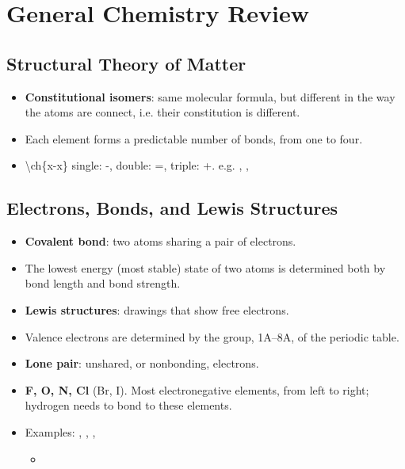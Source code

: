 \documentclass[12pt,a4paper]{article}
\begin{document}
\tableofcontents
\cleardoublepage
\fancyhead{}

\clearpage
{}
\clearpage
\section{General Chemistry Review}
\subsection{Structural Theory of Matter}
\begin{itemize}
    \item \textbf{Constitutional isomers}: same molecular formula, but different in the way the atoms are connect, i.e. their constitution is different.
    \item Each element forms a predictable number of bonds, from one to four.
    \item \textbackslash ch\{x-x\} single: -, double: =, triple: +. e.g. , , 
\end{itemize}

\subsection{Electrons, Bonds, and Lewis Structures}
\begin{itemize}
    \item \textbf{Covalent bond}: two atoms sharing a pair of electrons.
    \item The lowest energy (most stable) state of two atoms is determined both by bond length and bond strength.
    \item \textbf{Lewis structures}: drawings that show free electrons.
    \item Valence electrons are determined by the group, 1A--8A, of the periodic table.
    \item \textbf{Lone pair}: unshared, or nonbonding, electrons.
    \item \textbf{F, O, N, Cl} (Br, I). Most electronegative elements, from left to right; hydrogen needs to bond to these elements.
    \item Examples: , , , 
        \begin{itemize}
            \item {}
            \hspace{1cm}
        \end{itemize}
\end{itemize}
\end{document}
